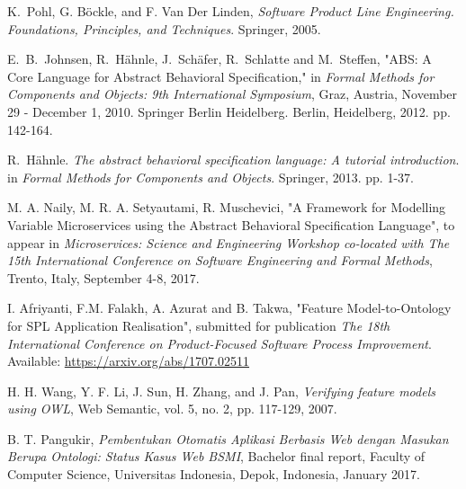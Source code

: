 \documentclass[conference]{IEEEtran}
\begin{document}
\begin{thebibliography}{1}


K.~Pohl, G. B\"{o}ckle, and F. Van Der Linden, \textit{Software Product Line Engineering. Foundations, Principles, and Techniques}. Springer, 2005.

E.~B.~Johnsen, R.~H\"{a}hnle, J.~Sch\"{a}fer, R.~Schlatte and M.~Steffen, "ABS: A Core Language for Abstract Behavioral Specification," in \textit{Formal Methods for Components and Objects: 9th International Symposium}, Graz, Austria, November 29 - December 1, 2010. Springer Berlin Heidelberg. Berlin, Heidelberg, 2012. pp. 142-164.

R.~H\"{a}hnle. \textit{The abstract behavioral specification language: A tutorial introduction}.
in \textit{Formal Methods for Components and Objects}. Springer, 2013. pp. 1-37.

M. A. Naily, M. R. A. Setyautami, R. Muschevici, "A Framework for Modelling Variable Microservices using the Abstract Behavioral Specification Language", to appear in \textit{Microservices: Science and Engineering Workshop co-located with The 15th International Conference on Software Engineering and Formal Methods}, Trento, Italy, September 4-8, 2017. 

I. Afriyanti, F.M. Falakh, A. Azurat and B. Takwa, "Feature Model-to-Ontology for SPL Application Realisation", submitted for publication \textit{The 18th International Conference on Product-Focused Software Process Improvement}. Available: \url{https://arxiv.org/abs/1707.02511}

H. H. Wang, Y. F. Li, J. Sun, H. Zhang, and J. Pan, \textit{Verifying feature models using OWL}, Web Semantic, vol. 5, no. 2, pp. 117-129, 2007.


B. T. Pangukir, \textit{Pembentukan Otomatis Aplikasi Berbasis Web dengan Masukan Berupa Ontologi: Status Kasus Web BSMI}, Bachelor final report, Faculty of Computer Science, Universitas Indonesia, Depok, Indonesia, January 2017.


\end{thebibliography}

\end{document}
